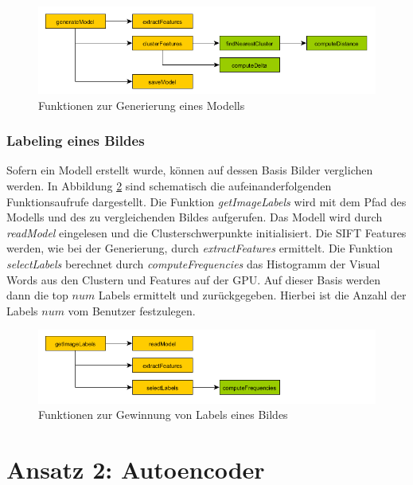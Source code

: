 \begin{figure}
	\centering
	\includegraphics[scale=0.8]{images/concept_bovw_1.png}
	\caption{Funktionen zur Generierung eines Modells}
	\label{img:concept_bovw_1}
\end{figure}

\subsubsection{Labeling eines Bildes}

Sofern ein Modell erstellt wurde, können auf dessen Basis Bilder verglichen werden. In Abbildung \ref{img:concept_bovw_2} sind schematisch die aufeinanderfolgenden Funktionsaufrufe dargestellt. Die Funktion \textit{getImageLabels} wird mit dem Pfad des Modells und des zu vergleichenden Bildes aufgerufen. Das Modell wird durch \textit{readModel} eingelesen und die Clusterschwerpunkte initialisiert. Die SIFT Features werden, wie bei der Generierung, durch \textit{extractFeatures} ermittelt. Die Funktion \textit{selectLabels} berechnet durch \textit{computeFrequencies} das Histogramm der Visual Words aus den Clustern und Features auf der GPU. Auf dieser Basis werden dann die top $num$ Labels ermittelt und zurückgegeben. Hierbei ist die Anzahl der Labels $num$ vom Benutzer festzulegen.

\begin{figure}
	\centering
	\includegraphics[scale=0.8]{images/concept_bovw_2.png}
	\caption{Funktionen zur Gewinnung von Labels eines Bildes}
	\label{img:concept_bovw_2}
\end{figure}

\section{Ansatz 2: Autoencoder}

